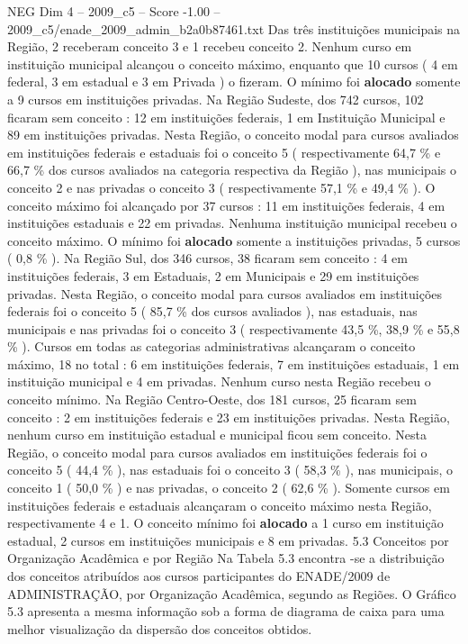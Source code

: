 \begin{textsample}{NEG Dim 4 – 2009\_c5 – Score -1.00 – 2009\_c5/enade\_2009\_admin\_b2a0b87461.txt}
Das três instituições municipais na Região, 2 receberam conceito 3 e 1 recebeu conceito 2.
Nenhum curso em instituição municipal alcançou o conceito máximo, enquanto que 10 cursos ( 4 em federal, 3 em estadual e 3 em Privada ) o fizeram.
O mínimo foi \textbf{alocado} somente a 9 cursos em instituições privadas.
Na Região Sudeste, dos 742 cursos, 102 ficaram sem conceito : 12 em instituições federais, 1 em Instituição Municipal e 89 em instituições privadas.
Nesta Região, o conceito modal para cursos avaliados em instituições federais e estaduais foi o conceito 5 ( respectivamente 64,7 \% e 66,7 \% dos cursos avaliados na categoria respectiva da Região ), nas municipais o conceito 2 e nas privadas o conceito 3 ( respectivamente 57,1 \% e 49,4 \% ).
O conceito máximo foi alcançado por 37 cursos : 11 em instituições federais, 4 em instituições estaduais e 22 em privadas.
Nenhuma instituição municipal recebeu o conceito máximo.
O mínimo foi \textbf{alocado} somente a instituições privadas, 5 cursos ( 0,8 \% ).
Na Região Sul, dos 346 cursos, 38 ficaram sem conceito : 4 em instituições federais, 3 em Estaduais, 2 em Municipais e 29 em instituições privadas.
Nesta Região, o conceito modal para cursos avaliados em instituições federais foi o conceito 5 ( 85,7 \% dos cursos avaliados ), nas estaduais, nas municipais e nas privadas foi o conceito 3 ( respectivamente 43,5 \%, 38,9 \% e 55,8 \% ).
Cursos em todas as categorias administrativas alcançaram o conceito máximo, 18 no total : 6 em instituições federais, 7 em instituições estaduais, 1 em instituição municipal e 4 em privadas.
Nenhum curso nesta Região recebeu o conceito mínimo.
Na Região Centro-Oeste, dos 181 cursos, 25 ficaram sem conceito : 2 em instituições federais e 23 em instituições privadas.
Nesta Região, nenhum curso em instituição estadual e municipal ficou sem conceito.
Nesta Região, o conceito modal para cursos avaliados em instituições federais foi o conceito 5 ( 44,4 \% ), nas estaduais foi o conceito 3 ( 58,3 \% ), nas municipais, o conceito 1 ( 50,0 \% ) e nas privadas, o conceito 2 ( 62,6 \% ).
Somente cursos em instituições federais e estaduais alcançaram o conceito máximo nesta Região, respectivamente 4 e 1.
O conceito mínimo foi \textbf{alocado} a 1 curso em instituição estadual, 2 cursos em instituições municipais e 8 em privadas. 5.3 Conceitos por Organização Acadêmica e por Região Na Tabela 5.3 encontra -se a distribuição dos conceitos atribuídos aos cursos participantes do ENADE/2009 de ADMINISTRAÇÃO, por Organização Acadêmica, segundo as Regiões.
O Gráfico 5.3 apresenta a mesma informação sob a forma de diagrama de caixa para uma melhor visualização da dispersão dos conceitos obtidos.

\end{textsample}

